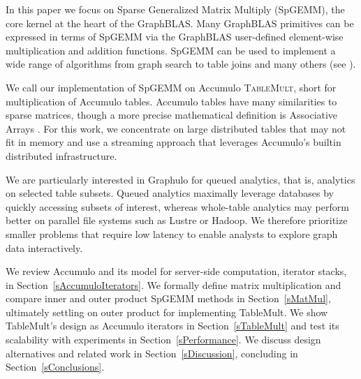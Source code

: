 
In this paper we focus on Sparse Generalized Matrix Multiply (SpGEMM), the core kernel at the heart of the GraphBLAS.
Many GraphBLAS primitives can be expressed in terms of
SpGEMM via the GraphBLAS user-defined element-wise multiplication and addition functions. 
SpGEMM can be used to implement a wide range of algorithms from graph search \cite{kepner2011graph} to table joins \cite{cohen2009mad} and many others (see \cite{bulucc2010highly}).

We call our implementation of SpGEMM on Accumulo \textsc{TableMult}, short for multiplication of Accumulo tables.
Accumulo tables have many similarities to sparse matrices, though a more precise mathematical definition is Associative Arrays 
\cite{kepner2014gabb}. For this work, we concentrate on
large distributed tables that may not fit in memory and use a streaming
approach that leverages Accumulo's builtin distributed infrastructure.

We are particularly interested in Graphulo for queued analytics, that is, analytics on selected table subsets.  
Queued analytics maximally leverage  databases
by quickly accessing subsets of interest, 
whereas whole-table analytics may perform better on parallel file systems such as Lustre or Hadoop.
We therefore prioritize smaller problems that require low latency
to enable analysts to explore graph data interactively.


We review Accumulo and its model for server-side computation, iterator stacks, 
in Section~\ref{sAccumuloIterators}.
We formally define matrix multiplication and compare inner and outer product SpGEMM methods
in Section~\ref{sMatMul}, ultimately settling on outer product for implementing TableMult.
We show TableMult's design as Accumulo iterators in Section~\ref{sTableMult}
and test its scalability with experiments in Section~\ref{sPerformance}.
We discuss design alternatives and related work in Section~\ref{sDiscussion}, 
concluding in Section~\ref{sConclusions}.

